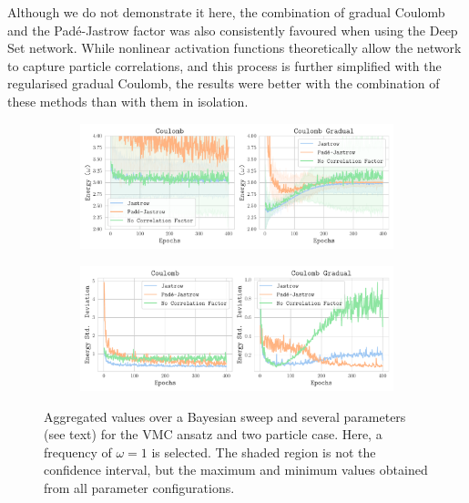 Although we do not demonstrate it here, the combination of gradual Coulomb and the Padé-Jastrow factor was also consistently favoured when using the Deep Set network. While nonlinear activation functions theoretically allow the network to capture particle correlations, and this process is further simplified with the regularised gradual Coulomb, the results were better with the combination of these methods than with them in isolation.

\begin{figure}[H]
    \centering
    \begin{subfigure}[b]{0.8\textwidth}
        \centering
        \includegraphics[width=\textwidth]{Chapters/Results/dots/n2_energy.pdf}
        \label{fig:}
        \vspace{-1cm}
    \end{subfigure}
    \begin{subfigure}[b]{0.8\textwidth}
        \centering
        \includegraphics[width=\textwidth]{Chapters/Results/dots/n2_std.pdf}
        \label{fig:}
    \end{subfigure}
    \caption{Aggregated values over a Bayesian sweep and several parameters (see text) for the VMC ansatz and two particle case. Here, a frequency of $\omega = 1$ is selected. The shaded region is not the confidence interval, but the maximum and minimum values obtained from all parameter configurations.}
    \label{fig:coulomb_gradual}
\end{figure}

